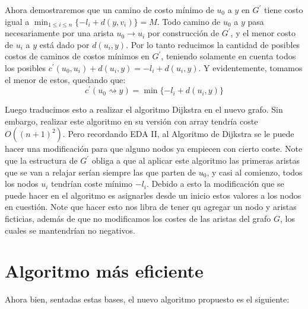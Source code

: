 \documentclass[a4paper]{article}
\begin{document}
	Ahora demostraremos que un camino de costo mínimo de $u_0$ a $y$ en $G^\prime$ tiene costo igual a $\min_{1\le i \le n}\{-l_{i} + d(y,v_{i})\} = M$. Todo camino de $u_0$ a $y$ pasa necesariamente por una arista $u_0 \rightarrow u_i$ por construcción de $G^\prime$, y el menor costo de $u_i$ a $y$ está dado por $d(u_i,y)$. Por lo tanto reducimos la cantidad de posibles costos de caminos de costos mínimos en $G^\prime$, teniendo solamente en cuenta todos los posibles $c^\prime(u_0,u_i) + d(u_i,y) = -l_i + d(u_i,y)$. Y evidentemente, tomamos el menor de estos, quedando que:
	$$c^\prime(u_0\rightsquigarrow y) = \min\{-l_i + d(u_i,y)\}$$
	
	Luego traducimos esto a realizar el algoritmo Dijkstra en el nuevo grafo. Sin embargo, realizar este algoritmo en su versión con array tendría coste $O((n+1)^2)$. Pero recordando EDA II, al Algoritmo de Dijkstra se le puede hacer una modificación para que alguno nodos ya empiecen con cierto coste. Note que la estructura de $G^\prime$ obliga a que al aplicar este algoritmo las primeras aristas que se van a relajar serían siempre las que parten de $u_0$, y casi al comienzo, todos los nodos $u_i$ tendrían coste mínimo $-l_i$. Debido a esto la modificación que se puede hacer en el algoritmo es asignarles desde un inicio estos valores a los nodos en cuestión. Note que hacer esto nos libra de tener qu agregar un nodo y aristas ficticias, además de que no modificamos los costes de las aristas del grafo $G$, los cuales se mantendrían no negativos.
	
	\section*{Algoritmo más eficiente}
	
	Ahora bien, sentadas estas bases, el nuevo algoritmo propuesto es el siguiente:
	
\end{document}
